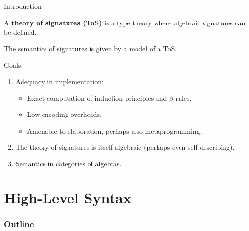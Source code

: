 \documentclass[dvipsnames]{beamer}
\begin{document}
\begin{frame}{Introduction}

A \textbf{theory of signatures (ToS)} is a type theory where algebraic signatures
can be defined.
\vspace{1em}

The semantics of signatures is given by a model of a ToS.
\vspace{1em}

\begin{block}{Goals}
\begin{enumerate}
  \item Adequacy in implementation:
    \begin{itemize}
      \item Exact computation of induction principles and $\beta$-rules.
      \item Low encoding overheads.
      \item Amenable to elaboration, perhaps also metaprogramming.
    \end{itemize}
  \item The theory of signatures is itself algebraic (perhaps even self-describing).
  \item Semantics in categories of algebras.
\end{enumerate}
\end{block}

\end{frame}

\section{High-Level Syntax}
\begin{frame}
  \frametitle{Outline}
  \tableofcontents[currentsection]
\end{frame}
\end{document}
